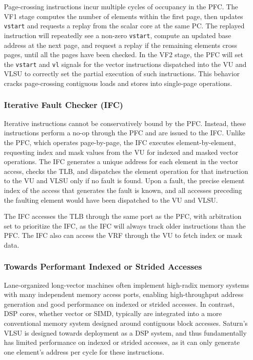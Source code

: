 Page-crossing instructions incur multiple cycles of occupancy in the PFC.
The VF1 stage computes the number of elements within the first page, then updates \texttt{vstart} and requests a replay from the scalar core at the same PC.
The replayed instruction will repeatedly see a non-zero \texttt{vstart}, compute an updated base address at the next page, and request a replay if the remaining elements cross pages, until all the pages have been checked.
In the VF2 stage, the PFC will set the \texttt{vstart} and \texttt{vl} signals for the vector instructions dispatched into the VU and VLSU to correctly set the partial execution of such instructions.
This behavior cracks page-crossing contiguous loads and stores into single-page operations.


\subsubsection{Iterative Fault Checker (IFC)}

Iterative instructions cannot be conservatively bound by the PFC.
Instead, these instructions perform a no-op through the PFC and are issued to the IFC.
Unlike the PFC, which operates page-by-page, the IFC executes element-by-element, requesting index and mask values from the VU for indexed and masked vector operations.
The IFC generates a unique address for each element in the vector access, checks the TLB, and dispatches the element operation for that instruction to the VU and VLSU only if no fault is found.
Upon a fault, the precise element index of the access that generates the fault is known, and all accesses preceding the faulting element would have been dispatched to the VU and VLSU.

The IFC accesses the TLB through the same port as the PFC, with arbitration set to prioritize the IFC, as the IFC will always track older instructions than the PFC.
The IFC also can access the VRF through the VU to fetch index or mask data.


\subsubsection{Towards Performant Indexed or Strided Accesses}

Lane-organized long-vector machines often implement high-radix memory systems with many independent memory access ports, enabling high-throughput address generation and good performance on indexed or strided accesses.
In contrast, DSP cores, whether vector or SIMD, typically are integrated into a more conventional memory system designed around contiguous block accesses.
Saturn's VLSU is designed towards deployment as a DSP system, and thus fundamentally has limited performance on indexed or strided accesses, as it can only generate one element's address per cycle for these instructions.

